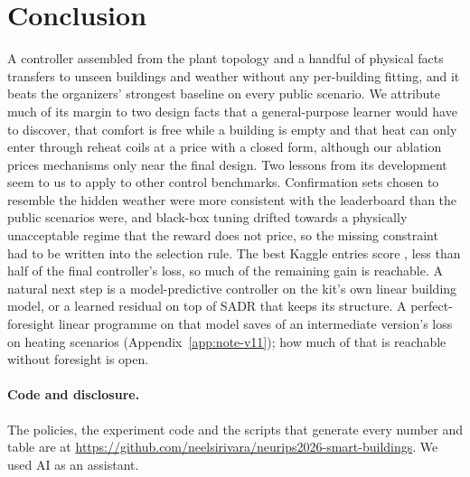 \documentclass{article}
\begin{document}
\section{Conclusion}
\label{sec:conclusion}
A controller assembled from the plant topology and a handful of physical facts transfers to unseen buildings and weather without any per-building fitting, and it beats the organizers' strongest baseline on every public scenario. We attribute much of its margin to two design facts that a general-purpose learner would have to discover, that comfort is free while a building is empty and that heat can only enter through reheat coils at a price with a closed form, although our ablation prices mechanisms only near the final design. Two lessons from its development seem to us to apply to other control benchmarks. Confirmation sets chosen to resemble the hidden weather were more consistent with the leaderboard than the public scenarios were, and black-box tuning drifted towards a physically unacceptable regime that the reward does not price, so the missing constraint had to be written into the selection rule. The best Kaggle entries score \FinKagBest, less than half of the final controller's loss, so much of the remaining gain is reachable. A natural next step is a model-predictive controller on the kit's own linear building model, or a learned residual on top of SADR that keeps its structure. A perfect-foresight linear programme on that model saves \RElvLpMean{} of an intermediate version's loss on \RElvLpN{} heating scenarios (Appendix~\ref{app:note-v11}); how much of that is reachable without foresight is open.

\paragraph{Code and disclosure.} The policies, the experiment code and the scripts that generate every number and table are at \url{https://github.com/neelsirivara/neurips2026-smart-buildings}. We used AI as an assistant.



\clearpage
\appendix
\let\oldsection\section
\renewcommand{\section}{\FloatBarrier\oldsection}
\end{document}
